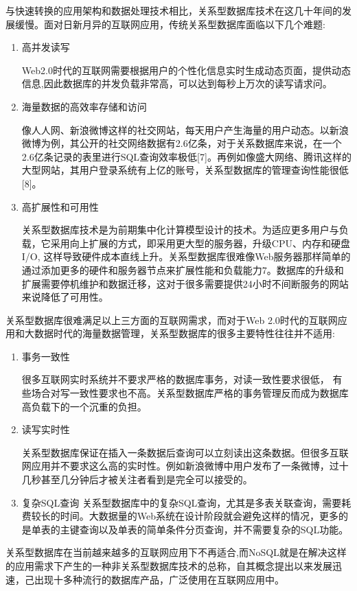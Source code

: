 \documentclass[11pt, a4paper, oneside]{ctexart}
\begin{document}
与快速转换的应用架构和数据处理技术相比，关系型数据库技术在这几十年间的发展缓慢。面对日新月异的互联网应用，传统关系型数据库面临以下几个难题\textsuperscript{\cite{ref2}}:
\begin{enumerate}
    \item 高并发读写
    
Web2.0时代的互联网需要根据用户的个性化信息实时生成动态页面，提供动态信息,因此数据库的并发负载非常高，可以达到每秒上万次的读写请求问。
    \item 海量数据的高效率存储和访问
    
像人人网、新浪微博这样的社交网站，每天用户产生海量的用户动态。以新浪微博为例，其公开的社交网络数据有2.6亿条，对于关系数据库来说，在一个2.6亿条记录的表里进行SQL查询效率极低[7]。再例如像盛大网络、腾讯这样的大型网站，其用户登录系统有上亿的账号，关系型数据库的管理查询性能很低[8]。
    \item 高扩展性和可用性
    
    关系型数据库技术是为前期集中化计算模型设计的技术。为适应更多用户与负载，它采用向上扩展的方式，即采用更大型的服务器，升级CPU、内存和硬盘I/O, 这样导致硬件成本直线上升。关系型数据库很难像Web服务器那样简单的通过添加更多的硬件和服务器节点来扩展性能和负载能力7。数据库的升级和扩展需要停机维护和数据迁移，这对于很多需要提供24小时不间断服务的网站来说降低了可用性。

\end{enumerate}

关系型数据库很难满足以上三方面的互联网需求，而对于Web 2.0时代的互联网应用和大数据时代的海量数据管理，关系型数据库的很多主要特性往往并不适用:
\begin{enumerate}
    \item 事务一致性
    
很多互联网实时系统并不要求严格的数据库事务，对读一致性要求很低， 有些场合对写一致性要求也不高。关系型数据库严格的事务管理反而成为数据库高负载下的一个沉重的负担。

    \item 读写实时性
 
关系型数据库保证在插入一条数据后查询可以立刻读出这条数据。但很多互联网应用并不要求这么高的实时性。例如新浪微博中用户发布了一条微博，过十几秒甚至几分钟后才被关注者看到是完全可以接受的。

    \item 复杂SQL查询
关系型数据库中的复杂SQL查询，尤其是多表关联查询，需要耗费较长的时间。大数据量的Web系统在设计阶段就会避免这样的情况，更多的是单表的主键查询以及单表的简单条件分页查询，并不需要复杂的SQL功能。
\end{enumerate}
关系型数据库在当前越来越多的互联网应用下不再适合,而NoSQL就是在解决这样的应用需求下产生的一种非关系型数据库技术的总称，自其概念提出以来发展迅速，己出现十多种流行的数据库产品，广泛使用在互联网应用中。
\end{document}
